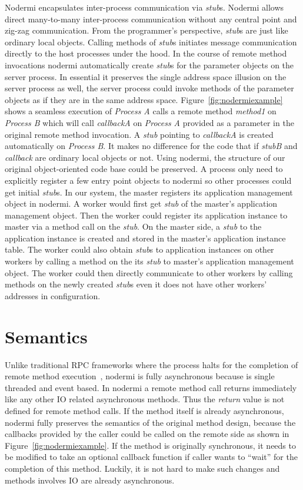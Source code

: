 Nodermi encapsulates inter-process communication via \emph{stub}s.
Nodermi allows direct many-to-many inter-process communication without
any central point and zig-zag communication.
From the programmer's perspective, 
\emph{stub}s are just like ordinary local objects.
Calling methods of \emph{stub}s initiates message
communication directly to the host processes under the hood.
In the course of remote method invocations
nodermi automatically 
create \emph{stub}s for the parameter objects on the server process.
In essential it preserves the single address space illusion on the
server process as well,
the server process could invoke methods of the parameter objects
as if they are in the same address space.
Figure~\ref{fig:nodermiexample} shows a
seamless execution of \emph{Process A}
calls a remote method \emph{method1} on \emph{Process B} which
will call \emph{callbackA} on  \emph{Process A} provided
as a parameter in the original remote method invocation.
A \emph{stub} pointing to \emph{callbackA} is created automatically
on \emph{Process B}.
It makes no difference for the code that if \emph{stubB} and \emph{callback}
are ordinary local objects or not.
Using nodermi, 
the structure of our original object-oriented code base could be preserved.
A process only need to explicitly register a few entry point objects to nodermi 
so other processes could get initial \emph{stub}s.
In our system, the master registers its application management object in nodermi.
A worker would first get \emph{stub} of the master's application management object.
Then the worker could register its application instance to master 
via a method call on the \emph{stub}.
On the master side, a \emph{stub} to the application instance is created and
stored in the master's application instance table.
The worker could also obtain \emph{stub}s to application instances on other workers by 
calling a method on the its \emph{stub} to master's application management object.
The worker could then directly communicate to other workers
by calling methods on the newly created \emph{stub}s 
even it does not have other workers' addresses in configuration.


\section{Semantics}

Unlike traditional RPC frameworks where the process halts for the
completion of remote method execution~\cite{birrell1984implementing},
nodermi is fully asynchronous because \nodejs
is single threaded and event based.
In nodermi a remote method call returns immediately
like any other IO related asynchronous methods.
Thus the \emph{return} value is not defined for remote method calls.
If the method itself is already asynchronous, 
nodermi fully preserves the semantics of the original method design,
because the callbacks provided by the caller could
be called on the remote side as shown in Figure~\ref{fig:nodermiexample}.
If the method is originally synchronous,
it needs to be modified to take an optional callback function
if caller wants to ``wait'' for the completion of this method.
Luckily, it is not hard to make such changes and methods involves
IO are already asynchronous.

